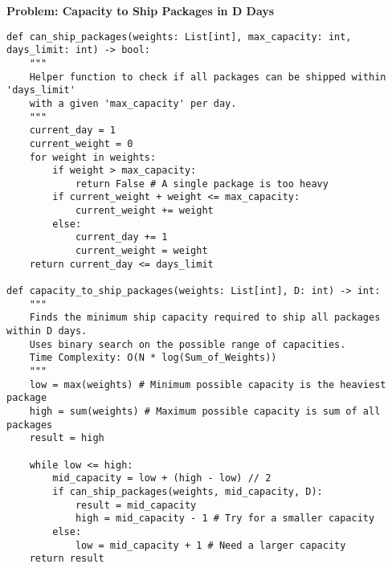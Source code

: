 \noindent\textbf{Problem: Capacity to Ship Packages in D Days}
\begin{verbatim}
def can_ship_packages(weights: List[int], max_capacity: int, days_limit: int) -> bool:
    """
    Helper function to check if all packages can be shipped within 'days_limit'
    with a given 'max_capacity' per day.
    """
    current_day = 1
    current_weight = 0
    for weight in weights:
        if weight > max_capacity:
            return False # A single package is too heavy
        if current_weight + weight <= max_capacity:
            current_weight += weight
        else:
            current_day += 1
            current_weight = weight
    return current_day <= days_limit

def capacity_to_ship_packages(weights: List[int], D: int) -> int:
    """
    Finds the minimum ship capacity required to ship all packages within D days.
    Uses binary search on the possible range of capacities.
    Time Complexity: O(N * log(Sum_of_Weights))
    """
    low = max(weights) # Minimum possible capacity is the heaviest package
    high = sum(weights) # Maximum possible capacity is sum of all packages
    result = high

    while low <= high:
        mid_capacity = low + (high - low) // 2
        if can_ship_packages(weights, mid_capacity, D):
            result = mid_capacity
            high = mid_capacity - 1 # Try for a smaller capacity
        else:
            low = mid_capacity + 1 # Need a larger capacity
    return result
\end{verbatim}

